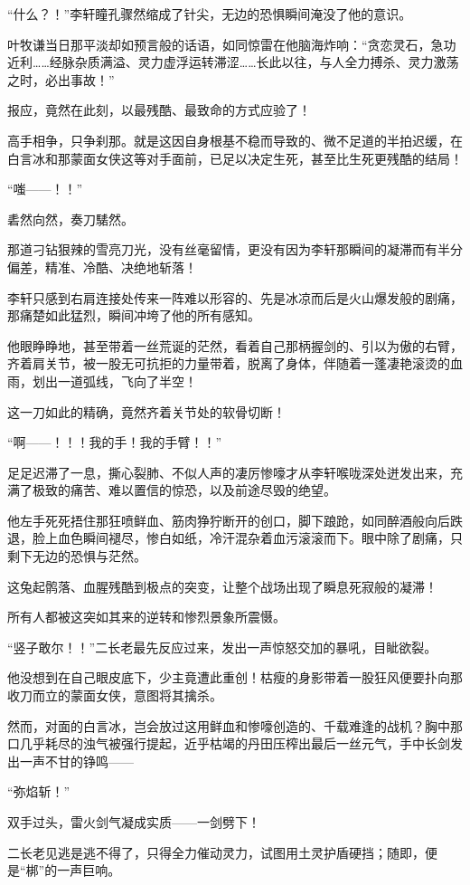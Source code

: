 “什么？！”李轩瞳孔骤然缩成了针尖，无边的恐惧瞬间淹没了他的意识。

叶牧谦当日那平淡却如预言般的话语，如同惊雷在他脑海炸响：“贪恋灵石，急功近利……经脉杂质满溢、灵力虚浮运转滞涩……长此以往，与人全力搏杀、灵力激荡之时，必出事故！”

报应，竟然在此刻，以最残酷、最致命的方式应验了！

高手相争，只争刹那。就是这因自身根基不稳而导致的、微不足道的半拍迟缓，在白言冰和那蒙面女侠这等对手面前，已足以决定生死，甚至比生死更残酷的结局！

“嗤——！！”

砉然向然，奏刀騞然。

那道刁钻狠辣的雪亮刀光，没有丝毫留情，更没有因为李轩那瞬间的凝滞而有半分偏差，精准、冷酷、决绝地斩落！

李轩只感到右肩连接处传来一阵难以形容的、先是冰凉而后是火山爆发般的剧痛，那痛楚如此猛烈，瞬间冲垮了他的所有感知。

他眼睁睁地，甚至带着一丝荒诞的茫然，看着自己那柄握剑的、引以为傲的右臂，齐着肩关节，被一股无可抗拒的力量带着，脱离了身体，伴随着一蓬凄艳滚烫的血雨，划出一道弧线，飞向了半空！

这一刀如此的精确，竟然齐着关节处的软骨切断！

“啊——！！！我的手！我的手臂！！”

足足迟滞了一息，撕心裂肺、不似人声的凄厉惨嚎才从李轩喉咙深处迸发出来，充满了极致的痛苦、难以置信的惊恐，以及前途尽毁的绝望。

他左手死死捂住那狂喷鲜血、筋肉狰狞断开的创口，脚下踉跄，如同醉酒般向后跌退，脸上血色瞬间褪尽，惨白如纸，冷汗混杂着血污滚滚而下。眼中除了剧痛，只剩下无边的恐惧与茫然。

这兔起鹘落、血腥残酷到极点的突变，让整个战场出现了瞬息死寂般的凝滞！

所有人都被这突如其来的逆转和惨烈景象所震慑。

“竖子敢尔！！”二长老最先反应过来，发出一声惊怒交加的暴吼，目眦欲裂。

他没想到在自己眼皮底下，少主竟遭此重创！枯瘦的身影带着一股狂风便要扑向那收刀而立的蒙面女侠，意图将其擒杀。

然而，对面的白言冰，岂会放过这用鲜血和惨嚎创造的、千载难逢的战机？胸中那口几乎耗尽的浊气被强行提起，近乎枯竭的丹田压榨出最后一丝元气，手中长剑发出一声不甘的铮鸣——

“弥焰斩！”

双手过头，雷火剑气凝成实质——一剑劈下！

二长老见逃是逃不得了，只得全力催动灵力，试图用土灵护盾硬挡；随即，便是“梆”的一声巨响。

